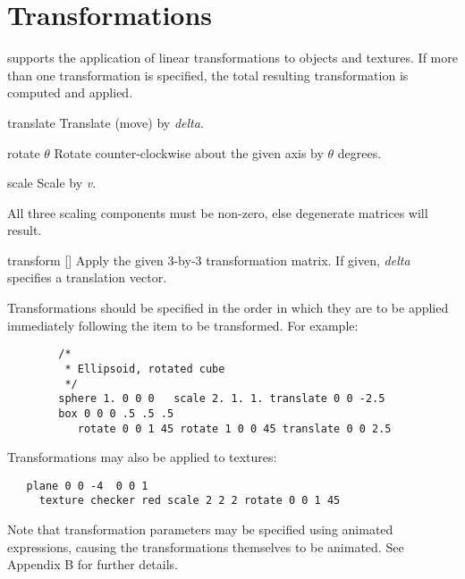 \chapter {Transformations}

{\Rayshade} supports the application of linear transformations to objects
and textures.  If more than one transformation is specified, the
total resulting transformation is computed and applied.

\begin{defkey}{translate}{}
Translate (move) by {\em delta}.
\end{defkey}

\begin{defkey}{rotate}{ $\theta$}
Rotate counter-clockwise about the given axis by $\theta$ degrees.
\end{defkey}

\begin{defkey}{scale}{}
Scale by {\em v}.
\end{defkey}
All three scaling components must be non-zero, else degenerate matrices
will result.

\begin{defkey}{transform}{   []}
Apply the given 3-by-3 transformation matrix.  If given, {\em delta}
specifies a translation vector.
\end{defkey}

Transformations should
be specified in the order in which they are to be applied
immediately following the item to
be transformed.  For example:

\begin{verbatim}
        /*
         * Ellipsoid, rotated cube
         */
        sphere 1. 0 0 0   scale 2. 1. 1. translate 0 0 -2.5
        box 0 0 0 .5 .5 .5
           rotate 0 0 1 45 rotate 1 0 0 45 translate 0 0 2.5
\end{verbatim}

Transformations may also be applied to textures:

\begin{verbatim}
   plane 0 0 -4  0 0 1
     texture checker red scale 2 2 2 rotate 0 0 1 45
\end{verbatim}

Note that transformation parameters may be specified using
animated expressions, causing the transformations themselves
to be animated.  See Appendix B for further details.
